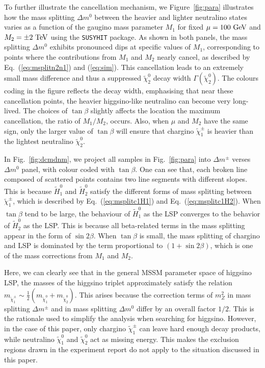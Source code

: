 \documentclass[letterpaper,11pt]{article}
\begin{document}
\par To further illustrate the cancellation mechanism, we  Figure~\ref{fig:para} illustrates how the mass splitting $\Delta m^0$ between the heavier and lighter neutralino states varies as a function of the gaugino mass parameter $M_1$ for fixed $\mu=100~{\rm GeV}$ and $M_2 = \pm 2~{\rm TeV}$ using the \texttt{SUSYHIT} package.
 As shown in both panels, the mass splitting $\Delta m^0$ exhibits pronounced dips at specific values of $M_1$, corresponding to points where the contributions from $M_1$ and $M_2$ nearly cancel, as described by Eq.~(\ref{eq:msplitn2n1}) and (\ref{eq:sim}). This cancellation leads to an extremely small mass difference and thus a suppressed $\tilde{\chi}_2^0$ decay width $\Gamma(\tilde{\chi}_2^0)$. The colours coding in the figure reflects the decay width, emphasising that near these cancellation points, the heavier higgsino-like neutralino can become very long-lived. The choices of $\tan\beta$  slightly affects the location the maximum cancellation, the ratio of $M_1/M_2$, occurs. Also, when $\mu$ and $M_2$ have the same sign, only the larger value of $\tan{\beta}$ will ensure that chargino $\tilde{\chi}_1^\pm$ is heavier than the lightest neutralino $\tilde{\chi}_2^0$. 
 
In Fig.~\ref{fig:dcmdnm}, we project all samples in Fig.~\ref{fig:para} into $\Delta m^\pm$ verses $\Delta m^0$ panel, with colour coded with $\tan{\beta}$. One can see that, each broken line composed of scattered points contains two line segments with different slopes. This is because $\tilde{H}_1^0$ and $\tilde{H}_2^0$ satisfy the different forms of mass splitting between $\tilde{\chi}_1^\pm$, which is described by Eq.~(\ref{eq:msplitc1H1}) and Eq.~(\ref{eq:msplitc1H2}). When $\tan{\beta}$ tend to be large, the behaviour of $\tilde{H}_1^0$ as the LSP converges to the behavior of $\tilde{H}_2^0$ as the LSP. This is because all beta-related terms in the mass splitting appear in the form of $\sin{2\beta}$. When $\tan{\beta}$ is small, the mass splitting of chargino and LSP is dominated by the term proportional to $(1+\sin{2\beta})$, which is one of the mass corrections from $M_1$ and $M_2$. 
\par Here, we can clearly see that in the general MSSM parameter space of higgsino LSP, the masses of the higgsino triplet approximately satisfy the relation $m_{\tilde{\chi}_1^\pm} \sim \frac{1}{2}(m_{\tilde{\chi}_1^0} + m_{\tilde{\chi}_2^0})$. This arises because the correction terms of $m_Z^2$ in mass splitting $\Delta m^\pm$ and in mass splitting $\Delta m^0$ differ by an overall factor $1/2$. This is the rationale used to simplify the analysis when searching for higgsino. However, in the case of this paper, only chargino $\tilde{\chi}_1^\pm$ can leave hard enough decay products, while neutralino $\tilde{\chi}_1^0$ and $\tilde{\chi}_2^0$ act as missing energy. This makes the exclusion regions drawn in the experiment report do not apply to the situation discussed in this paper.
\end{document}
